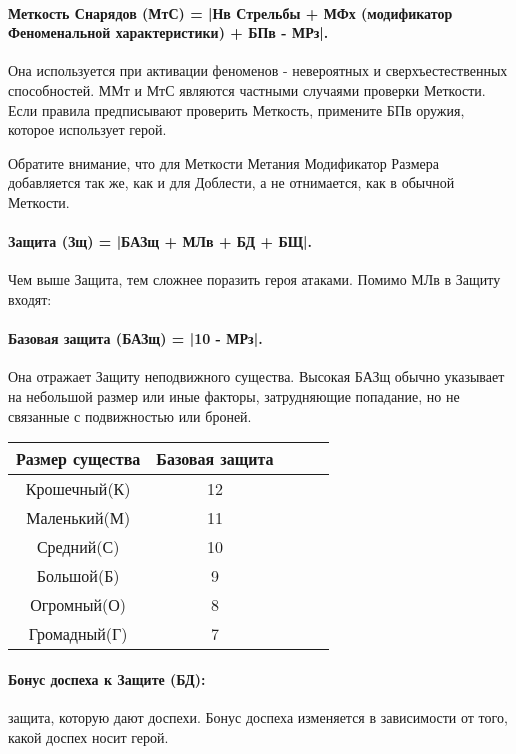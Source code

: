 \paragraph{Меткость Снарядов (МтС) = |Нв Стрельбы + МФх (модификатор Феноменальной характеристики) + БПв - МРз|.} Она используется при активации феноменов - невероятных и сверхъестественных способностей.
\newline ММт и МтС являются частными случаями проверки Меткости. Если правила предписывают проверить Меткость, примените БПв оружия, которое использует герой.
\begin{tcolorbox}
	Обратите внимание, что для Меткости Метания Модификатор Размера добавляется так же, как и для Доблести, а не отнимается, как в обычной Меткости.
\end{tcolorbox}
\paragraph{Защита (Зщ) = |БАЗщ + МЛв + БД + БЩ|.} Чем выше Защита, тем сложнее поразить героя атаками. Помимо МЛв в Защиту входят:
\paragraph{Базовая защита (БАЗщ) = |10 - МРз|.} Она отражает Защиту неподвижного существа. Высокая БАЗщ обычно указывает на небольшой размер или иные факторы, затрудняющие попадание, но не связанные с подвижностью или броней. 
\begin{center}
    \begin{tabular}{ |c|c|c|c|c| }
        \hline
        Размер существа & Базовая защита
        \\ \hline
        Крошечный(К) & 12
        \\ \hline
        Маленький(М) & 11
        \\ \hline
        Средний(С) & 10
        \\ \hline
        Большой(Б) & 9
        \\ \hline
        Огромный(О) & 8
        \\ \hline
        Громадный(Г) & 7
        \\ \hline
    \end{tabular}
\end{center}

\paragraph{Бонус доспеха к Защите (БД):} защита, которую дают доспехи. Бонус доспеха изменяется в зависимости от того, какой доспех носит герой.

